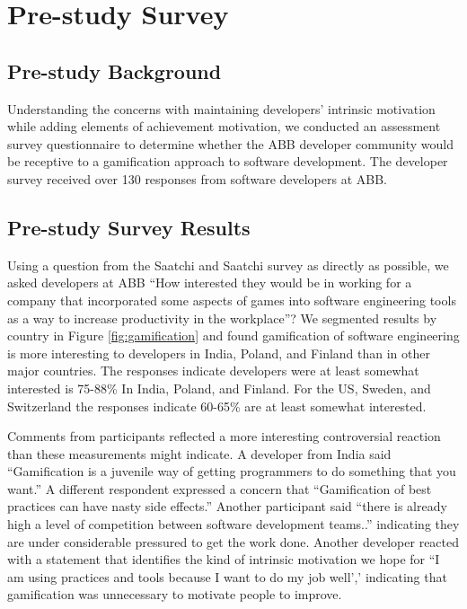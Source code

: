 \documentclass{sig-alternate}
\begin{document}
\section{Pre-study Survey}

\subsection{Pre-study Background}

Understanding the concerns with maintaining developers'  intrinsic motivation while adding elements of achievement motivation, we conducted an assessment survey questionnaire to determine whether the ABB developer community would be receptive to a gamification approach to software development.  The developer survey received over 130 responses from software developers at ABB.

\subsection{Pre-study Survey Results}

Using a question from the Saatchi and Saatchi survey \cite{wbsnipes:SaatchiGameification} as directly as possible, we asked developers at ABB ``How interested they would be in working for a company that incorporated some aspects of games into software engineering tools as a way to increase productivity in the workplace''?  We segmented results by country in Figure \ref{fig:gamification} and found gamification of software engineering is more interesting to developers in India, Poland, and Finland than in other major countries.  The responses indicate developers were at least somewhat interested is 75-88\% In India, Poland, and Finland.  For the US, Sweden, and Switzerland the responses indicate 60-65\% are at least somewhat interested.  

Comments from participants reflected a more interesting controversial reaction than these measurements might indicate.  A developer from India said ``Gamification is a juvenile way of getting programmers to do something that you want.''  A different respondent expressed a concern that ``Gamification of best practices can have nasty side effects.''  Another participant said ``there is already high a level of competition between software development teams..'' indicating they are under considerable pressured to get the work done.  Another developer reacted with a statement that identifies the kind of intrinsic motivation we hope for ``I am using practices and tools because I want to do my job well',' indicating that gamification was unnecessary to motivate people to improve.
\end{document}
